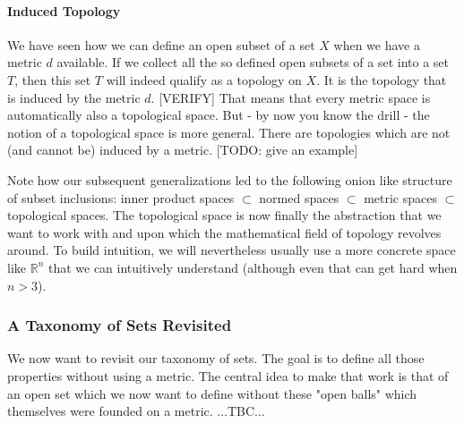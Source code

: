 
\paragraph{Induced Topology} 
We have seen how we can define an open subset of a set $X$ when we have a metric $d$ available. If we collect all the so defined open subsets of a set into a set $T$, then this set $T$ will indeed qualify as a topology on $X$. It is the topology that is induced by the metric $d$. [VERIFY] That means that every metric space is automatically also a topological space. But - by now you know the drill - the notion of a topological space is more general. There are topologies which are not (and cannot be) induced by a metric. [TODO: give an example]


\medskip
Note how our subsequent generalizations led to the following onion like structure of subset inclusions: inner product spaces $\subset$ normed spaces $\subset$ metric spaces $\subset$ topological spaces. The topological space is now finally the abstraction that we want to work with and upon which the mathematical field of topology revolves around. To build intuition, we will nevertheless usually use a more concrete space like $\mathbb{R}^n$ that we can intuitively understand (although even that can get hard when $n > 3$).






\subsubsection{A Taxonomy of Sets Revisited}
We now want to revisit our taxonomy of sets. The goal is to define all those properties without using a metric. The central idea to make that work is that of an open set which we now want to define without these "open balls" which themselves were founded on a metric. ...TBC...





